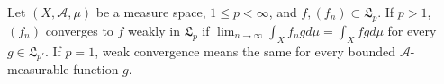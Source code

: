 Let $(X, \mathcal{A}, \mu)$ be a measure space, $1 \leq p < \infty$, and $f, (f_n) \subset \mathfrak{L}_p$. If $p > 1$, $(f_n)$ converges to $f$ weakly in $\mathfrak{L}_p$ if $\lim_{n \to \infty} \int_X f_n g d\mu = \int_X f g d\mu$ for every $g \in \mathfrak{L}_{p'}$. If $p = 1$, weak convergence means the same for every bounded $\mathcal{A}$-measurable function $g$.
